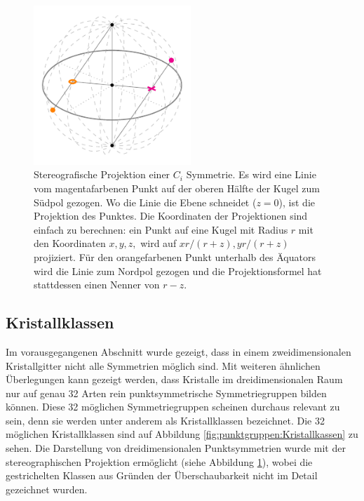 \begin{figure}
    \centering
    \includegraphics[height=6cm]{papers/punktgruppen/figures/stereographic-projections}
    \caption{
      Stereografische Projektion einer \(C_{i}\) Symmetrie. Es wird eine Linie vom magentafarbenen Punkt auf der oberen Hälfte der Kugel zum Südpol gezogen.
      Wo die Linie die Ebene schneidet (\(z = 0\)), ist die Projektion des Punktes.
      Die Koordinaten der Projektionen sind einfach zu berechnen: ein Punkt auf eine Kugel mit Radius \(r\) mit den Koordinaten \(x, y, z,\) wird auf \(xr/(r + z), yr/(r + z)\) projiziert.
      Für den orangefarbenen Punkt unterhalb des Äquators wird die Linie zum Nordpol gezogen und die Projektionsformel hat stattdessen einen Nenner von \(r - z\).
    }
    \label{fig:punktgruppen:stereographic-projections}
\end{figure}

\subsection{Kristallklassen}

Im vorausgegangenen Abschnitt wurde gezeigt, dass in einem zweidimensionalen Kristallgitter nicht alle Symmetrien möglich sind.
 Mit weiteren ähnlichen Überlegungen kann gezeigt werden, dass Kristalle im dreidimensionalen Raum nur auf genau 32 Arten rein punktsymmetrische Symmetriegruppen bilden können.
 Diese 32 möglichen Symmetriegruppen scheinen durchaus relevant zu sein, denn sie werden unter anderem als Kristallklassen bezeichnet.
 Die 32 möglichen Kristallklassen sind auf Abbildung \ref{fig:punktgruppen:Kristallkassen} zu sehen.
 Die Darstellung von dreidimensionalen Punktsymmetrien wurde mit der stereographischen Projektion ermöglicht (siehe Abbildung \ref{fig:punktgruppen:stereographic-projections}), wobei die gestrichelten Klassen aus Gründen der Überschaubarkeit nicht im Detail gezeichnet wurden.



